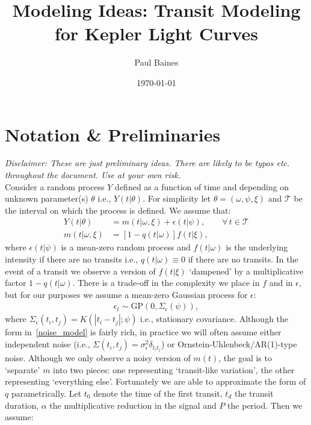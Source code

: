 \documentclass[a4paper,11pt]{article}
\begin{document}
\title{Modeling Ideas: Transit Modeling for Kepler Light Curves}
\author{Paul Baines}
\date{\today}
\maketitle

\section{Notation \& Preliminaries}

\emph{Disclaimer: These are just preliminary ideas. There are likely to be typos etc. throughout the document. Use at your own risk. \smiley}\\
$ $\\
Consider a random process $Y$ defined as a function of time and depending on unknown parameter(s) $\theta$ i.e., $Y(t|\theta)$. For simplicity let $\theta=(\omega,\psi,\xi)$ and $\mathcal{T}$ be the interval on which the process is defined. We assume that:
\begin{align*}
 Y(t|\theta) &= m(t|\omega,\xi) + \epsilon(t|\psi) , \qquad \forall \, t \in \mathcal{T} \\
 m(t|\omega,\xi) &= \left[1-q(t|\omega)\right]f(t|\xi) , 
\end{align*}
where $\epsilon(t|\psi)$ is a mean-zero random process and $f(t|\omega)$ is the underlying intensity if there are no transits i.e., $q(t|\omega)\equiv{}0$ if there are no transits. In the event of a transit we observe a version of $f(t|\xi)$ \lq{}dampened\rq{} by a multiplicative factor $1-q(t|\omega)$. There is a trade-off in the complexity we place in $f$ and in $\epsilon$, but for our purposes we assume a mean-zero Gaussian process for $\epsilon$:
\begin{align}\label{noise_model}
\epsilon_{t} \sim \textrm{GP}\left(0,\Sigma_{\epsilon}(\psi)\right) ,
\end{align}
where $\Sigma_{\epsilon}(t_{i},t_{j})=K(|t_{i}-t_{j}|;\psi)$ i.e., stationary covariance. Although the form in~\eqref{noise_model} is fairly rich, in practice we will often assume either independent noise (i.e., $\Sigma(t_{i},t_{j})=\sigma^{2}_{\epsilon}\delta_{t_{i}t_{j}}$) or Ornstein-Uhlenbeck/AR(1)-type noise. Although we only observe a noisy version of $m(t)$, the goal is to \lq{}separate\rq{} $m$ into two pieces: one representing \lq{}transit-like variation\rq{}, the other representing \lq{}everything else\rq{}. Fortunately we are able to approximate the form of $q$ parametrically. Let $t_{0}$ denote the time of the first transit, $t_{d}$ the transit duration, $\alpha$ the multiplicative reduction in the signal and $P$ the period. Then we assume:
\end{document}
